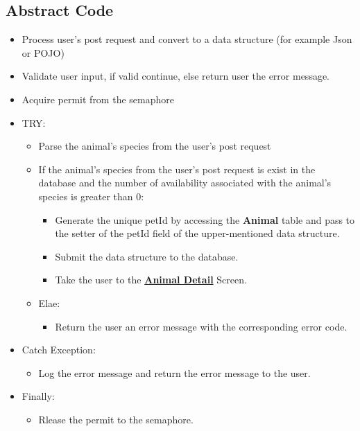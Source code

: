 \documentclass[a4paper]{article}
\begin{document}
\subsection*{Abstract Code}

\begin{itemize}
	\item Process user's post request and convert to a data structure (for example Json or POJO)
	\item Validate user input, if valid continue, else return user the error message.
	\item Acquire permit from the semaphore
	\item TRY:
	\begin{itemize}

	\item Parse the animal's species from the user's post request
	\item If the animal's species from the user's post request is exist in the database and the number of availability associated with the animal's species is greater than 0:
		\begin{itemize}
			\item Generate the unique petId by accessing the \textbf{Animal} table and pass to the setter of the petId field of the upper-mentioned data structure.
			\item Submit the data structure to the database.
			\item Take the user to the \underline{\textbf{Animal Detail}} Screen.
		\end{itemize}
	\item Elae:
		\begin{itemize}
			\item Return the user an error message with the corresponding error code.
		\end{itemize}

	\end{itemize}
	\item Catch Exception:
		\begin{itemize}
		\item Log the error message and return the error message to the user.
		\end{itemize}
	\item Finally:
		\begin{itemize}
		\item Rlease the permit to the semaphore.
		\end{itemize}
\end{itemize}
\end{document}
